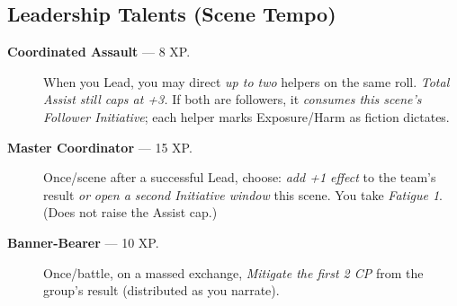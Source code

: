 \documentclass[11pt]{article}
\begin{document}
\subsection*{Leadership Talents (Scene Tempo)}
\begin{description}
  \item[\textbf{Coordinated Assault} — 8 XP.] When you Lead, you may direct \emph{up to two} helpers on the same roll. \emph{Total Assist still caps at +3.} If both are followers, it \emph{consumes this scene’s Follower Initiative}; each helper marks Exposure/Harm as fiction dictates.
  \item[\textbf{Master Coordinator} — 15 XP.] Once/scene after a successful Lead, choose: \emph{add +1 effect} to the team’s result \emph{or} \emph{open a second Initiative window} this scene. You take \emph{Fatigue 1}. (Does not raise the Assist cap.)
  \item[\textbf{Banner-Bearer} — 10 XP.] Once/battle, on a massed exchange, \emph{Mitigate the first 2 CP} from the group’s result (distributed as you narrate).
\end{description}
\end{document}

